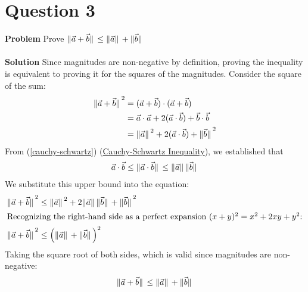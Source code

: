 \documentclass{article}
\begin{document}
\section{Question 3}
\label{question-3}
\textbf{Problem}
Prove $\norm*{\vec{a} + \vec{b}} \le \norm*{\vec{a}} + \norm*{\vec{b}}$
\\
\\
\textbf{Solution}
Since magnitudes are non-negative by definition, proving the inequality is
equivalent to proving it for the squares of the magnitudes. Consider the square
of the sum:
\begin{align*}
	\norm*{\vec{a} + \vec{b}}^{2} & = (\vec{a} + \vec{b}) \cdot (\vec{a} + \vec{b})                            \\
	                              & = \vec{a} \cdot \vec{a} + 2(\vec{a} \cdot \vec{b}) + \vec{b} \cdot \vec{b} \\
	                              & = \norm*{\vec{a}}^{2} + 2(\vec{a} \cdot \vec{b}) + \norm*{\vec{b}}^{2}     \\
\end{align*}
From (\ref{cauchy-schwartz})
(\href{https://en.wikipedia.org/wiki/Cauchy%E2%80%93Schwarz_inequality}{Cauchy-Schwartz Inequality}),
we established that
\begin{align*}
	\vec{a} \cdot \vec{b} \le \norm*{\vec{a} \cdot \vec{b}} \le \norm*{\vec{a}}\norm*{\vec{b}}
\end{align*}
We substitute this upper bound into the equation:
\begin{align*}
	\norm*{\vec{a} + \vec{b}}^2 & \le \norm*{\vec{a}}^2 + 2\norm*{\vec{a}}\norm*{\vec{b}} + \norm*{\vec{b}}^2 \\
	\intertext{Recognizing the right-hand side as a perfect expansion $(x+y)^{2}=x^{2} + 2xy + y^{2}$:}
	\norm*{\vec{a} + \vec{b}}^2 & \le \left( \norm*{\vec{a}} + \norm*{\vec{b}} \right)^2
\end{align*}
Taking the square root of both sides, which is valid since magnitudes are
non-negative:
\begin{align}
	\norm*{\vec{a} + \vec{b}} \le \norm*{\vec{a}} + \norm*{\vec{b}} \label{triangle-inequality}
\end{align}

\pagebreak

\end{document}

